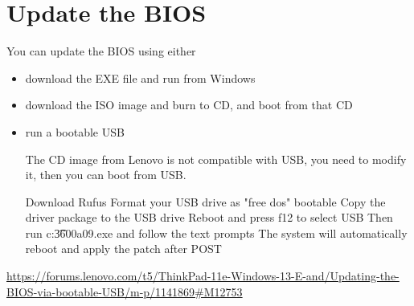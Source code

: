 \section{Update the BIOS}

You can update the BIOS using either
\begin{itemize}
  \item download the EXE file and run from Windows
  
  \item download the ISO image and burn to CD, and boot from that CD
  
  \item run a bootable USB

The CD image from Lenovo is not compatible with USB, you need to modify it, then
you can boot from USB.

Download Rufus Format your USB drive as "free dos" bootable Copy the driver
package to the USB drive Reboot and press f12 to select USB Then run
c:\t3600a09.exe and follow the text prompts The system will automatically reboot
and apply the patch after POST


\end{itemize}


\url{https://forums.lenovo.com/t5/ThinkPad-11e-Windows-13-E-and/Updating-the-BIOS-via-bootable-USB/m-p/1141869#M12753}